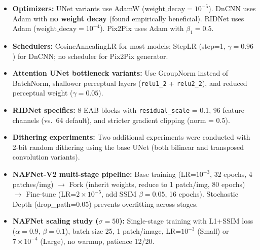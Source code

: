 \begin{itemize}
    \item \textbf{Optimizers:} UNet variants use AdamW ($\text{weight\_decay} = 10^{-5}$). DnCNN uses Adam with \textbf{no weight decay} (found empirically beneficial). RIDNet uses Adam ($\text{weight\_decay} = 10^{-4}$). Pix2Pix uses Adam with $\beta_1 = 0.5$.
    
    \item \textbf{Schedulers:} CosineAnnealingLR for most models; StepLR (step=1, $\gamma = 0.96$) for DnCNN; no scheduler for Pix2Pix generator.
    
    \item \textbf{Attention UNet bottleneck variants:} Use GroupNorm instead of BatchNorm, shallower perceptual layers (\texttt{relu1\_2} + \texttt{relu2\_2}), and reduced perceptual weight ($\gamma = 0.05$).
    
    \item \textbf{RIDNet specifics:} 8 EAB blocks with \texttt{residual\_scale} = 0.1, 96 feature channels (vs.\ 64 default), and stricter gradient clipping (norm = 0.5).
    
    \item \textbf{Dithering experiments:} Two additional experiments were conducted with 2-bit random dithering using the base UNet (both bilinear and transposed convolution variants).
    
    \item \textbf{NAFNet-V2 multi-stage pipeline:} Base training (LR=$10^{-3}$, 32 epochs, 4 patches/img) $\to$ Fork (inherit weights, reduce to 1 patch/img, 80 epochs) $\to$ Fine-tune (LR=$2\times10^{-5}$, add SSIM $\beta = 0.05$, 16 epochs). Stochastic Depth (drop\_path=0.05) prevents overfitting across stages.
    
    \item \textbf{NAFNet scaling study ($\sigma\!=\!50$):} Single-stage training with L1+SSIM loss ($\alpha\!=\!0.9$, $\beta\!=\!0.1$), batch size 25, 1 patch/image, LR=$10^{-3}$ (Small) or $7\!\times\!10^{-4}$ (Large), no warmup, patience 12/20.
\end{itemize}
